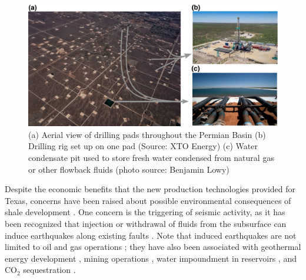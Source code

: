 \begin{figure}
	\centering
	\includegraphics[width=\linewidth]{figures/chapter3-permian/permian-images.pdf}
	\caption[Permian Basin drilling pads]{
		(a) Aerial view of drilling pads throughout the Permian Basin
		(b) Drilling rig set up on one pad
		(Source: XTO Energy)
		(c) Water condensate pit used to store fresh water condensed from natural gas or other flowback fluids (photo source: Benjamin Lowy)
	}
	\label{fig:ch3-drilling-pads}
\end{figure}


Despite the economic benefits that the new production technologies provided for Texas, concerns have been raised about possible environmental consequences of shale development \citep{TheAcademyofMedicine2017EnvironmentalCommunityImpacts, Scanlon2020WillWaterIssues}. 
One concern is the triggering of seismic activity, as it has been recognized that injection or withdrawal of fluids from the subsurface can induce earthquakes along existing faults \citep{Ellsworth2013InjectionInducedEarthquakes, Simpson1988TwoTypesReservoir}.
Note that induced earthquakes are not limited to oil and gas operations \citep{Grigoli2017CurrentChallengesMonitoring, Foulger2018GlobalReviewHuman, Baan2017HumanInducedSeismicity}; they have also been associated with geothermal energy development \citep{Deichmann2009EarthquakesInducedStimulation}, mining operations \citep{Hasegawa1989InducedSeismicityMines}, water impoundment in reservoirs \citep{Talwani1997NatureReservoirInduced}, and CO$_2$ sequestration \citep{Gan2013GasInjectionMay}.



